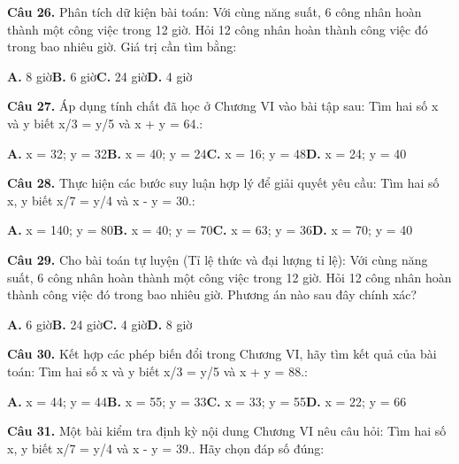 \documentclass[11pt,a4paper]{article}
\begin{document}
\textbf{\color{primary} Câu 26.} Phân tích dữ kiện bài toán: Với cùng năng suất, 6 công nhân hoàn thành một công việc trong 12 giờ. Hỏi 12 công nhân hoàn thành công việc đó trong bao nhiêu giờ. Giá trị cần tìm bằng:\par
\hspace*{1.5em}\textbf{A.} 8 giờ\quad\quad \textbf{B.} 6 giờ\quad\quad \textbf{C.} 24 giờ\quad\quad \textbf{D.} 4 giờ\par\vspace{2pt}
\textbf{\color{primary} Câu 27.} Áp dụng tính chất đã học ở Chương VI vào bài tập sau: Tìm hai số x và y biết x/3 = y/5 và x + y = 64.:\par
\hspace*{1.5em}\textbf{A.} x = 32; y = 32\quad\quad \textbf{B.} x = 40; y = 24\quad\quad \textbf{C.} x = 16; y = 48\quad\quad \textbf{D.} x = 24; y = 40\par\vspace{2pt}
\textbf{\color{primary} Câu 28.} Thực hiện các bước suy luận hợp lý để giải quyết yêu cầu: Tìm hai số x, y biết x/7 = y/4 và x - y = 30.:\par
\hspace*{1.5em}\textbf{A.} x = 140; y = 80\quad\quad \textbf{B.} x = 40; y = 70\quad\quad \textbf{C.} x = 63; y = 36\quad\quad \textbf{D.} x = 70; y = 40\par\vspace{2pt}
\textbf{\color{primary} Câu 29.} Cho bài toán tự luyện (Tỉ lệ thức và đại lượng tỉ lệ): Với cùng năng suất, 6 công nhân hoàn thành một công việc trong 12 giờ. Hỏi 12 công nhân hoàn thành công việc đó trong bao nhiêu giờ. Phương án nào sau đây chính xác?\par
\hspace*{1.5em}\textbf{A.} 6 giờ\quad\quad \textbf{B.} 24 giờ\quad\quad \textbf{C.} 4 giờ\quad\quad \textbf{D.} 8 giờ\par\vspace{2pt}
\textbf{\color{primary} Câu 30.} Kết hợp các phép biến đổi trong Chương VI, hãy tìm kết quả của bài toán: Tìm hai số x và y biết x/3 = y/5 và x + y = 88.:\par
\hspace*{1.5em}\textbf{A.} x = 44; y = 44\quad\quad \textbf{B.} x = 55; y = 33\quad\quad \textbf{C.} x = 33; y = 55\quad\quad \textbf{D.} x = 22; y = 66\par\vspace{2pt}
\textbf{\color{primary} Câu 31.} Một bài kiểm tra định kỳ nội dung Chương VI nêu câu hỏi: Tìm hai số x, y biết x/7 = y/4 và x - y = 39.. Hãy chọn đáp số đúng:\par
\end{document}
